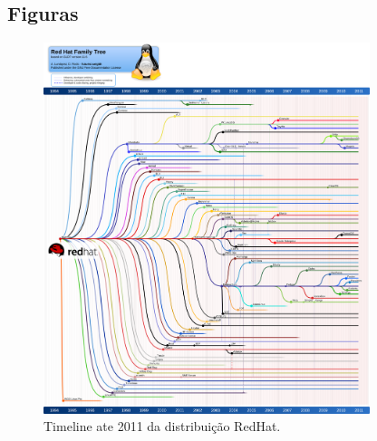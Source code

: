 \begin{anexosenv}

\partanexos


\chapter{\nmu Figuras}
\label{anexos}



\begin{figure}[h]
  \centering
	\includegraphics[width=0.85\textwidth]{figuras/redhat-timeline}
  \caption[Timeline RedHat]{Timeline ate 2011 da distribuição RedHat\protect\footnotemark.}
  \label{fig:figuras_linux_timeline_redhat}
\end{figure}


\end{anexosenv}

